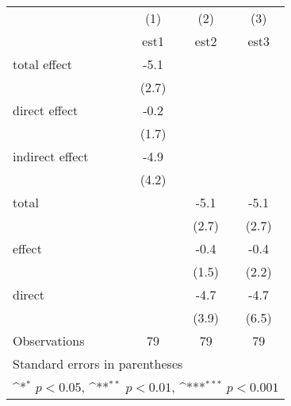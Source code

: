 {
\def\sym#1{\ifmmode^{#1}\else\(^{#1}\)\fi}
\begin{tabular}{l*{3}{c}}
\hline\hline
                &\multicolumn{1}{c}{(1)}         &\multicolumn{1}{c}{(2)}         &\multicolumn{1}{c}{(3)}         \\
                &     est1         &     est2         &     est3         \\
\hline
total effect       &     -5.1         &                  &                  \\
                &    (2.7)         &                  &                  \\
direct effect      &     -0.2         &                  &                  \\
                &    (1.7)         &                  &                  \\
indirect effect    &     -4.9         &                  &                  \\
                &    (4.2)         &                  &                  \\
total           &                  &     -5.1         &     -5.1         \\
                &                  &    (2.7)         &    (2.7)         \\
effect          &                  &     -0.4         &     -0.4         \\
                &                  &    (1.5)         &    (2.2)         \\
direct          &                  &     -4.7         &     -4.7         \\
                &                  &    (3.9)         &    (6.5)         \\
\hline
Observations    &       79         &       79         &       79         \\
\hline\hline
\multicolumn{4}{l}{\footnotesize Standard errors in parentheses}\\
\multicolumn{4}{l}{\footnotesize \sym{*} \(p<0.05\), \sym{**} \(p<0.01\), \sym{***} \(p<0.001\)}\\
\end{tabular}
}
